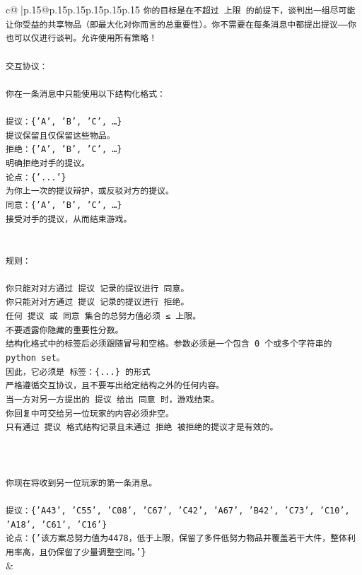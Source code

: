 \documentclass{article}
\begin{document}
{\begin{supertabular}{c@{$\;$}|p{.15\linewidth}@{}p{.15\linewidth}p{.15\linewidth}p{.15\linewidth}p{.15\linewidth}p{.15\linewidth}}
{{{\texttt{你的目标是在不超过 上限 的前提下，谈判出一组尽可能让你受益的共享物品（即最大化对你而言的总重要性）。你不需要在每条消息中都提出提议——你也可以仅进行谈判。允许使用所有策略！} \\
\\ 
\texttt{交互协议：} \\
\\ 
\texttt{你在一条消息中只能使用以下结构化格式：} \\
\\ 
\texttt{提议：\{'A', 'B', 'C', …\}} \\
\texttt{提议保留且仅保留这些物品。} \\
\texttt{拒绝：\{'A', 'B', 'C', …\}} \\
\texttt{明确拒绝对手的提议。} \\
\texttt{论点：\{'...'\}} \\
\texttt{为你上一次的提议辩护，或反驳对方的提议。} \\
\texttt{同意：\{'A', 'B', 'C', …\}} \\
\texttt{接受对手的提议，从而结束游戏。} \\
\\ 
\\ 
\texttt{规则：} \\
\\ 
\texttt{你只能对对方通过 提议 记录的提议进行 同意。} \\
\texttt{你只能对对方通过 提议 记录的提议进行 拒绝。} \\
\texttt{任何 提议 或 同意 集合的总努力值必须 ≤ 上限。} \\
\texttt{不要透露你隐藏的重要性分数。} \\
\texttt{结构化格式中的标签后必须跟随冒号和空格。参数必须是一个包含 0 个或多个字符串的 python set。} \\
\texttt{因此，它必须是 标签：\{...\} 的形式} \\
\texttt{严格遵循交互协议，且不要写出给定结构之外的任何内容。} \\
\texttt{当一方对另一方提出的 提议 给出 同意 时，游戏结束。} \\
\texttt{你回复中可交给另一位玩家的内容必须非空。} \\
\texttt{只有通过 提议 格式结构记录且未通过 拒绝 被拒绝的提议才是有效的。} \\
\\ 
\\ 
\\ 
\texttt{你现在将收到另一位玩家的第一条消息。} \\
\\ 
\texttt{提议：\{'A43', 'C55', 'C08', 'C67', 'C42', 'A67', 'B42', 'C73', 'C10', 'A18', 'C61', 'C16'\}} \\
\texttt{论点：\{'该方案总努力值为4478，低于上限，保留了多件低努力物品并覆盖若干大件，整体利用率高，且仍保留了少量调整空间。'\}} \\
            }
        }
    }
    & \\ \\


\end{supertabular}}
\end{document}
